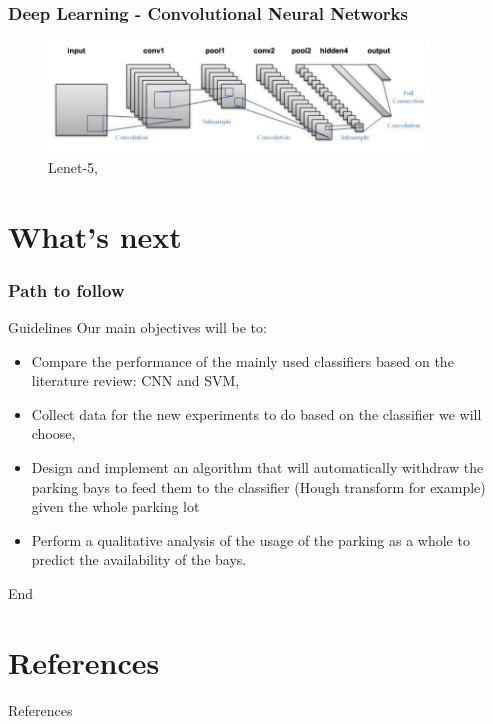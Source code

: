 \documentclass{beamer}
\begin{document}
\begin{frame}
\frametitle{Deep Learning - Convolutional Neural Networks }

\begin{figure}[h!]
    \centering
    \includegraphics[width=0.9\textwidth]{Pictures/lenet_architecture}
    \caption{Lenet-5, \cite{Lecun98gradient-basedlearning}}
\end{figure}

\end{frame}


\section{What's next}

\begin{frame}
\frametitle{Path to follow}
\begin{block}{Guidelines}
Our main objectives will be to:
\begin{itemize}
\item Compare the performance of the mainly used classifiers based on the literature review: CNN and SVM,
\item Collect data for the new experiments to do based on the classifier we will choose,
\item Design and implement an algorithm that will automatically withdraw the parking bays to feed them to the classifier (Hough transform for example) given the whole parking lot
\item Perform a qualitative analysis of the usage of the parking as a whole to predict the availability of the bays.

\end{itemize}

\end{block}
\end{frame}


\begin{frame}
\Huge{\centerline{End}}
\end{frame}


\section{References}
\begin{frame}[allowframebreaks]{References}%
\footnotesize{

}
\end{frame}
\end{document}
